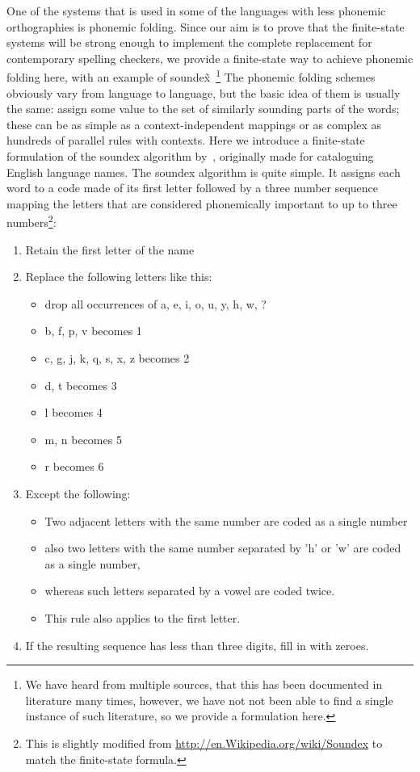 \documentclass[a4paper,12pt]{article}
\begin{document}
One of the systems that is used in some of the languages with less phonemic
orthographies is phonemic folding. Since our aim is to prove that the
finite-state systems will be strong enough to implement the complete
replacement for contemporary spelling checkers, we provide a finite-state way
to achieve phonemic folding here, with an example of soundex̃~\footnote{We have
    heard from multiple sources, that this has been documented in literature
    many times, however, we have not not been able to find a single instance of
such literature, so we provide a formulation here.} The phonemic folding
schemes obviously vary from language to language, but the basic idea of them is
usually the same: assign some value to the set of similarly sounding parts of
the words; these can be as simple as a context-independent mappings or as
complex as hundreds of parallel rules with contexts. Here we introduce a
finite-state formulation of the soundex algorithm by~\cite{russell1918soundex},
originally made for cataloguing English language names. The soundex algorithm
is quite simple. It assigns each word to a code made of its first letter
followed by a three number sequence mapping the letters that are considered
phonemically important to up to three numbers\footnote{This is slightly
modified from \url{http://en.Wikipedia.org/wiki/Soundex} to match the
finite-state formula.}:

\begin{enumerate}
    \item Retain the first letter of the name 
    \item Replace the following letters like this:\begin{itemize}
            \item drop all occurrences of a, e, i, o, u, y, h, w, ?
            \item b, f, p, v becomes 1
            \item c, g, j, k, q, s, x, z becomes 2
            \item d, t becomes 3
            \item l becomes 4
            \item m, n becomes 5
            \item r becomes 6
        \end{itemize}
    \item Except the following:\begin{itemize}
            \item Two adjacent letters with the same number are coded as a
                single number
            \item also two letters with the same number separated by 'h' or 'w'
                are coded as a single number,
            \item whereas such letters separated by a vowel are coded twice.
            \item This rule also applies to the first letter.
        \end{itemize}
    \item If the resulting sequence has less than three digits, fill in with
        zeroes.
\end{enumerate}
\end{document}
